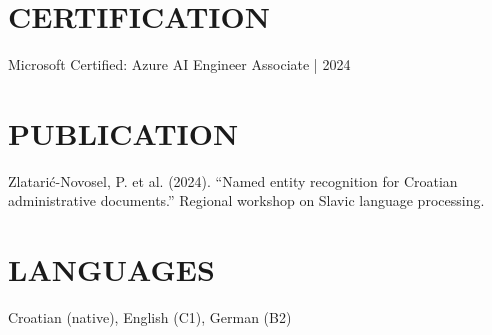 \documentclass[11pt,a4paper]{article}
\begin{document}
\section*{CERTIFICATION}
Microsoft Certified: Azure AI Engineer Associate | 2024

\section*{PUBLICATION}
Zlatarić-Novosel, P. et al. (2024). “Named entity recognition for Croatian administrative documents.” Regional workshop on Slavic language processing.

\section*{LANGUAGES}
Croatian (native), English (C1), German (B2)
\end{document}
